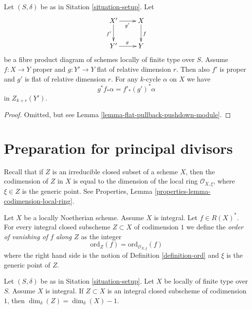 \begin{lemma}
\label{lemma-flat-pullback-proper-pushforward}
Let $(S, \delta)$ be as in Sitation \ref{situation-setup}.
Let
$$
\xymatrix{
X' \ar[r]_{g'} \ar[d]_{f'} & X \ar[d]^f \\
Y' \ar[r]^g & Y
}
$$
be a fibre product diagram of schemes locally of finite type over $S$.
Assume $f : X \to Y$ proper and $g : Y' \to Y$ flat of relative dimension $r$.
Then also $f'$ is proper and $g'$ is flat of relative dimension $r$.
For any $k$-cycle $\alpha$ on $X$ we have
$$
g^*f_*\alpha = f'_*(g')^*\alpha
$$
in $Z_{k + r}(Y')$.
\end{lemma}

\begin{proof}
Omitted, but see Lemma \ref{lemma-flat-pullback-pushdown-module}.
\end{proof}









\section{Preparation for principal divisors}
\label{section-preparation-principal-divisors}

\noindent
Recall that if $Z$ is an irreducible closed subset of a scheme $X$,
then the codimension of $Z$ in $X$ is equal to the dimension
of the local ring $\mathcal{O}_{X, \xi}$, where $\xi \in Z$
is the generic point. See
Properties, Lemma \ref{properties-lemma-codimension-local-ring}.

\begin{definition}
\label{definition-order-vanishing}
Let $X$ be a locally Noetherian scheme. Assume $X$ is integral.
Let $f \in R(X)^*$. For every integral closed subscheme
$Z \subset X$ of codimension $1$ we define
the {\it order of vanishing of $f$ along $Z$} as the integer
$$
\text{ord}_Z(f) = \text{ord}_{\mathcal{O}_{X, \xi}}(f)
$$
where the right hand side is the notion of
Definition \ref{definition-ord} and $\xi$ is the generic point of $Z$.
\end{definition}

\begin{lemma}
\label{lemma-divisor-delta-dimension}
Let $(S, \delta)$ be as in Sitation \ref{situation-setup}.
Let $X$ be locally of finite type over $S$. Assume $X$ is
integral. If $Z \subset X$ is an integral closed subscheme
of codimension $1$, then $\dim_\delta(Z) = \dim_\delta(X) - 1$.
\end{lemma}

